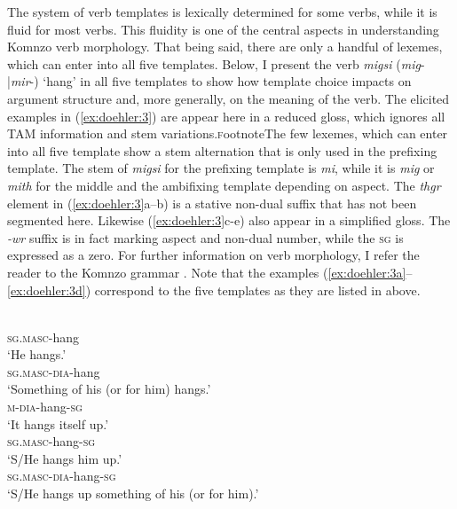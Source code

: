 \documentclass[output=paper]{langscibook}
\begin{document}
The system of verb templates is lexically determined for some verbs, while it is fluid for most verbs. This fluidity is one of the central aspects in understanding Komnzo verb morphology. That being said, there are only a handful of lexemes, which can enter into all five templates. Below, I present the verb \emph{migsi} (\emph{mig}-|\emph{mir}-) `hang' in all five templates to show how template choice impacts on argument structure and, more generally, on the meaning of the verb. The elicited examples in (\ref{ex:doehler:3}) are appear here in a reduced gloss, which ignores all TAM information and stem variations.\textsc{f}ootnote{The few lexemes, which can enter into all five template show a stem alternation that is only used in the prefixing template. The stem of \emph{migsi} for the prefixing template is \emph{mi}, while it is \emph{mig} or \emph{mith} for the middle and the ambifixing template depending on aspect. The \emph{thgr} element in (\ref{ex:doehler:3}a--b) is a stative non-dual suffix that has not been segmented here. Likewise (\ref{ex:doehler:3}c-e) also appear in a simplified gloss. The \emph{-wr} suffix is in fact marking aspect and non-dual number, while the \textsc{sg}{} is expressed as a zero. For further information on verb morphology, I refer the reader to the Komnzo grammar \citep{Doehler2018}.} Note that the examples (\ref{ex:doehler:3a}--\ref{ex:doehler:3d}) correspond to the five templates as they are listed in  above.

\ea
	\label{ex:doehler:3}
	\ea
			\\
			\textsc{sg}.\textsc{masc}-hang\\
			\glt `He hangs.'
			\label{ex:doehler:3a}
		\ex
			\\
			\textsc{sg}.\textsc{masc}-\textsc{dia}-hang\\
			\glt `Something of his (or for him) hangs.'
			\label{ex:doehler:3b}
			\ex
			\\
			\textsc{m}-\textsc{dia}-hang-\textsc{sg}\\
			\glt `It hangs itself up.'
			\label{ex:doehler:3c}
			\ex
			\\
			\textsc{sg}.\textsc{masc}-hang-\textsc{sg}\\
			\glt `S/He hangs him up.'
			\label{ex:doehler:3d}
			\ex
			\\
			\textsc{sg}.\textsc{masc}-\textsc{dia}-hang-\textsc{sg}\\
			\glt `S/He hangs up something of his (or for him).'
			\label{ex:doehler:3e}
	\z
	\z
	
\end{document}
